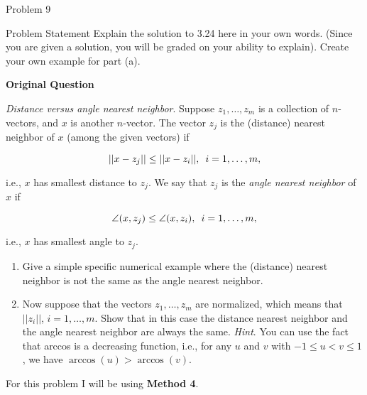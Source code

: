 \begin{problem}{Problem 9}
    \begin{statement}{Problem Statement}
        Explain the solution to 3.24 here in your own words. (Since you are given a solution, you will be graded on your ability to explain). Create your own example for part (a). \vspace*{1em}

        \textbf{Original Question} \vspace*{1em}

        \textit{Distance versus angle nearest neighbor}. Suppose $z_{1} , \dots , z_{m}$ is a collection of $n$-vectors, and $x$ is another $n$-vector. The vector $z_{j}$ is the (distance) nearest neighbor of
        $x$ (among the given vectors) if

        \begin{equation*}
            ||x-z_{j}|| \leq ||x - z_{i}||, \hspace*{5pt} i = 1 , \dots , m,
        \end{equation*}

        i.e., $x$ has smallest distance to $z_{j}$. We say that $z_{j}$ is the \textit{angle nearest neighbor} of $x$ if

        \begin{equation*}
            \angle (x,z_{j}) \leq \angle (x,z_{i}), \hspace*{5pt} i = 1 , \dots , m,
        \end{equation*}

        i.e., $x$ has smallest angle to $z_{j}$.

        \begin{enumerate}[label=(\alph*)]
            \item Give a simple specific numerical example where the (distance) nearest neighbor is not the same as the angle nearest neighbor.
            \item Now suppose that the vectors $z_{1} , \dots , z_{m}$ are normalized, which means that $||z_{i}||$, $i = 1 , \dots , m$. Show that in this case the distance nearest neighbor and the angle nearest 
            neighbor are always the same. \textit{Hint}. You can use the fact that arccos is a decreasing function, i.e., for any $u$ and $v$ with $-1 \leq u < v \leq 1$, we have $\arccos{(u)} > \arccos{(v)}$.
        \end{enumerate}
    \end{statement}

    \begin{highlight}
        For this problem I will be using \textbf{Method 4}. \vspace*{1em}


\end{highlight}
\end{problem}
